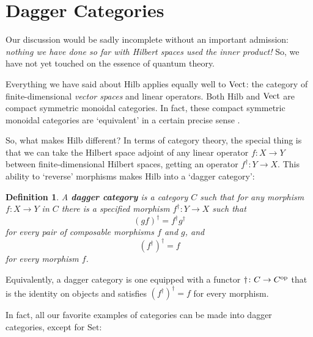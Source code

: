 \documentclass[12pt,twoside,openright]{report}
\newtheorem{definition}[thm]{Definition}
\newcommand{\Hilb}{\mathrm{Hilb}}
\newcommand{\Set}{\mathrm{Set}}
\newcommand{\Vect}{{\rm Vect}}
\newcommand{\maps}{\colon}
\newcommand{\op}{{\rm op}}
\begin{document}
\section{Dagger Categories}
\label{dagger}

Our discussion would be sadly incomplete without an important admission: {\it nothing we have done so far with Hilbert spaces used the inner product!}   So, we have not yet touched on the essence of quantum theory.

Everything we have said about $\Hilb$ applies equally well to $\Vect$:
the category of finite-dimensional {\it vector spaces} and linear operators.  Both $\Hilb$ and $\Vect$ are compact symmetric monoidal categories.  In fact, these compact symmetric monoidal categories are
`equivalent' in a certain precise sense \cite{MacLane2}.

So, what makes $\Hilb$ different?  In terms of category theory, the special thing is that we can take the Hilbert space adjoint of any linear operator $f \maps X \to Y$ between finite-dimensional Hilbert spaces, getting an operator $f^\dagger \maps Y \to X$.  This ability to `reverse' morphisms makes $\Hilb$ into a `dagger category':

\begin{definition}
A {\bf dagger category} is a category $C$ such that for any morphism
$f \maps X \to Y$ in $C$ there is a specified morphism $f^\dagger \maps Y \to X$ such that
\[  (gf)^\dagger = f^\dagger g^\dagger  \]
for every pair of composable morphisms $f$ and $g$, and 
\[       (f^\dagger)^\dagger = f  \]
for every morphism $f$.
\end{definition}
Equivalently, a dagger category is one equipped with a functor $\dagger \maps C \to C^\op$ 
that is the identity on objects and satisfies 
$(f^\dagger)^\dagger = f$ for every morphism.

In fact, all our favorite examples of categories can be made into dagger categories, except for $\Set$:
\end{document}
